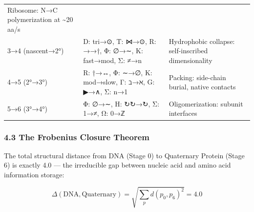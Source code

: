 \documentclass[12pt,a4paper]{article}
\begin{document}
\begin{longtable}[]{@{}lll@{}}
\begin{minipage}[t]{0.38\columnwidth}
Ribosome: N→C polymerization at \textasciitilde20 aa/s\strut
\end{minipage}\tabularnewline
\begin{minipage}[t]{0.24\columnwidth}\raggedright
3→4 (nascent→2°)\strut
\end{minipage} & \begin{minipage}[t]{0.30\columnwidth}\raggedright
D: tri→⊙, T: ⋈→⊙, R: →→†, Φ: ∅→∼, K: fast→mod, Σ: ≠→n\strut
\end{minipage} & \begin{minipage}[t]{0.38\columnwidth}\raggedright
Hydrophobic collapse: self-inscribed dimensionality\strut
\end{minipage}\tabularnewline
\begin{minipage}[t]{0.24\columnwidth}\raggedright
4→5 (2°→3°)\strut
\end{minipage} & \begin{minipage}[t]{0.30\columnwidth}\raggedright
R: †→↔, Φ: ∼→∅, K: mod→slow, Γ: ℶ→ℵ, G: ▶→∧, Σ: n→1\strut
\end{minipage} & \begin{minipage}[t]{0.38\columnwidth}\raggedright
Packing: side-chain burial, native contacts\strut
\end{minipage}\tabularnewline
\begin{minipage}[t]{0.24\columnwidth}\raggedright
5→6 (3°→4°)\strut
\end{minipage} & \begin{minipage}[t]{0.30\columnwidth}\raggedright
Φ: ∅→∼, H: ↻↻→↻, Σ: 1→≠, Ω: 0→ℤ\strut
\end{minipage} & \begin{minipage}[t]{0.38\columnwidth}\raggedright
Oligomerization: subunit interfaces\strut
\end{minipage}\tabularnewline
\bottomrule
\end{longtable}

\hypertarget{the-frobenius-closure-theorem}{%
\subsubsection{4.3 The Frobenius Closure
Theorem}\label{the-frobenius-closure-theorem}}

The total structural distance from DNA (Stage 0) to Quaternary Protein
(Stage 6) is exactly 4.0 --- the irreducible gap between nucleic acid
and amino acid information storage:

\[\Delta(\text{DNA}, \text{Quaternary}) = \sqrt{\sum_{p} d(p_0, p_6)^2} = 4.0\]
\end{document}
